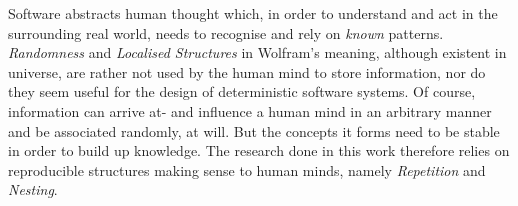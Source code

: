 Software abstracts human thought which, in order to understand and act in the
surrounding real world, needs to recognise and rely on \emph{known} patterns.
\emph{Randomness} and \emph{Localised Structures} in Wolfram's meaning,
although existent in universe, are rather not used by the human mind to store
information, nor do they seem useful for the design of deterministic software
systems. Of course, information can arrive at- and influence a human mind in an
arbitrary manner and be associated randomly, at will. But the concepts it forms
need to be stable in order to build up knowledge. The research done in this
work therefore relies on reproducible structures making sense to human minds,
namely \emph{Repetition} and \emph{Nesting}.
